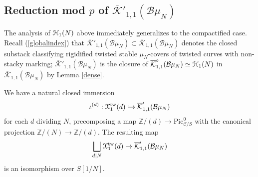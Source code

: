 \documentclass[11pt]{amsart}
\theoremstyle{definition}
\begin{document}
\subsection*{Reduction mod $p$ of $\overline{\mathcal{K}}'_{1,1}({\mathcal{B}} \mu_N)$}

The analysis of ${\mathbf{\EuScript{H}}}_1(N)$ above immediately generalizes to the compactified case. Recall (\ref{globalindex}) that $\overline{\mathcal{K}}'_{1,1}({\mathcal{B}} \mu_N) \subset \overline{\mathcal{K}}_{1,1}({\mathcal{B}} \mu_N)$ denotes the closed substack classifying rigidified twisted stable $\mu_N$-covers of twisted curves with non-stacky marking; $\overline{\mathcal{K}}'_{1,1}({\mathcal{B}} \mu_N)$ is the closure of $\overline{\mathcal{K}}^\circ_{1,1} ({\mathcal{B}} \mu_N) \simeq {\mathbf{\EuScript{H}}}_1(N)$ in $\overline{\mathcal{K}}_{1,1}({\mathcal{B}} \mu_N)$ by Lemma \ref{dense}.

We have a natural closed immersion
\begin{displaymath}
\iota^{(d)}:{\mathbf{\EuScript{X}}}^{\mathrm{tw}}_1(d)\hookrightarrow \overline{\mathcal{K}}'_{1,1}({\mathcal{B}} \mu_N)
\end{displaymath}
for each $d$ dividing $N$, precomposing a map $\mathbb{Z}/(d) \rightarrow \mathrm{Pic}^0_{{\mathcal{C}}/S}$ with the canonical projection $\mathbb{Z}/(N) \rightarrow \mathbb{Z}/(d)$. The resulting map 
\begin{displaymath}
\bigsqcup_{d|N} {\mathbf{\EuScript{X}}}^{\mathrm{tw}}_1(d) \rightarrow \overline{\mathcal{K}}'_{1,1}({\mathcal{B}} \mu_N)
\end{displaymath}
is an isomorphism over $S[1/N]$.
\end{document}
